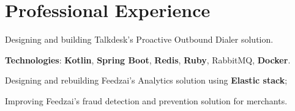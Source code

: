 \documentclass[letterpaper]{deedy-resume} %
\begin{document}
\begin{minipage}[t]{0.64\textwidth} %


\section{Professional Experience}
\vspace{0.5mm}

\vspace{3.0mm}
Designing and building Talkdesk's Proactive Outbound Dialer solution.
\vspace{0.5mm}

\textbf{Technologies}: \textbf{Kotlin}, \textbf{Spring Boot}, \textbf{Redis}, \textbf{Ruby}, RabbitMQ, \textbf{Docker}.


\vspace{4.0mm}



\vspace{3.0mm}
\begin{tightitemize}
	\item Designing and rebuilding Feedzai's Analytics solution using \textbf{Elastic stack};
	\item Improving Feedzai's fraud detection and prevention solution for merchants.
\end{tightitemize}

\vspace{0.5mm}


\end{minipage}
\end{document}
